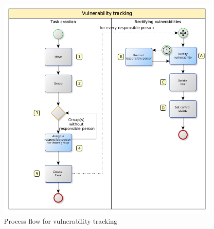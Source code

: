 \documentclass[a4paper,10pt]{book}
\begin{document}
\begin{figure}[htb!]
  \centering
  \includegraphics[scale=.54]{Screenshot/GSM-Vulnerability-Tracking-Process-en.png}
  \caption{\label{Process flow for vulnerability tracking} Process flow for vulnerability tracking}
\end{figure}
\newline
\end{document}
